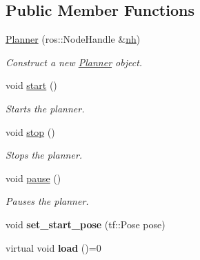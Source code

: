 \subsection*{Public Member Functions}
\begin{DoxyCompactItemize}
\item 
\hyperlink{classPlanner_a32475baddd401921adb1aab3ab842210}{Planner} (ros\+::\+Node\+Handle \&\hyperlink{classPlanner_a9714d036f444a07ce90be8d135b9a40c}{nh})
\begin{DoxyCompactList}\small\item\em Construct a new \hyperlink{classPlanner}{Planner} object. \end{DoxyCompactList}\item 
void \hyperlink{classPlanner_a6c1c8d67d0cac41f738b413d1833c007}{start} ()\hypertarget{classPlanner_a6c1c8d67d0cac41f738b413d1833c007}{}\label{classPlanner_a6c1c8d67d0cac41f738b413d1833c007}

\begin{DoxyCompactList}\small\item\em Starts the planner. \end{DoxyCompactList}\item 
void \hyperlink{classPlanner_a3d0a3d404d39f59bfc21f275b0da408a}{stop} ()\hypertarget{classPlanner_a3d0a3d404d39f59bfc21f275b0da408a}{}\label{classPlanner_a3d0a3d404d39f59bfc21f275b0da408a}

\begin{DoxyCompactList}\small\item\em Stops the planner. \end{DoxyCompactList}\item 
void \hyperlink{classPlanner_a400f2aefad591e55a62e0fb13cb02521}{pause} ()\hypertarget{classPlanner_a400f2aefad591e55a62e0fb13cb02521}{}\label{classPlanner_a400f2aefad591e55a62e0fb13cb02521}

\begin{DoxyCompactList}\small\item\em Pauses the planner. \end{DoxyCompactList}\item 
void {\bfseries set\+\_\+start\+\_\+pose} (tf\+::\+Pose pose)\hypertarget{classPlanner_acaf55e0e250d6f3ba14bfcf3c4f06ffb}{}\label{classPlanner_acaf55e0e250d6f3ba14bfcf3c4f06ffb}

\item 
virtual void {\bfseries load} ()=0\hypertarget{classPlanner_af10d045ffe58c7d2149156567dc8b10a}{}\label{classPlanner_af10d045ffe58c7d2149156567dc8b10a}

\end{DoxyCompactItemize}

